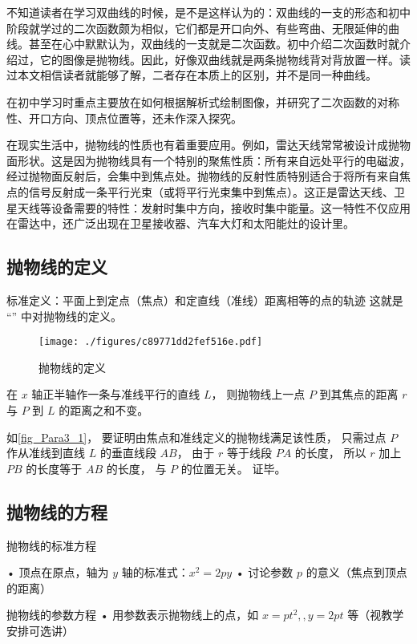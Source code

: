 
\begin{issues}
\issueDraft
\end{issues}



不知道读者在学习双曲线的时候，是不是这样认为的：双曲线的一支的形态和初中阶段就学过的二次函数颇为相似，它们都是开口向外、有些弯曲、无限延伸的曲线。甚至在心中默默认为，双曲线的一支就是二次函数。初中介绍二次函数时就介绍过，它的图像是抛物线。因此，好像双曲线就是两条抛物线背对背放置一样。读过本文相信读者就能够了解，二者存在本质上的区别，并不是同一种曲线。

在初中学习时重点主要放在如何根据解析式绘制图像，并研究了二次函数的对称性、开口方向、顶点位置等，还未作深入探究。

在现实生活中，抛物线的性质也有着重要应用。例如，雷达天线常常被设计成抛物面形状。这是因为抛物线具有一个特别的聚焦性质：所有来自远处平行的电磁波，经过抛物面反射后，会集中到焦点处。抛物线的反射性质特别适合于将所有来自焦点的信号反射成一条平行光束（或将平行光束集中到焦点）。这正是雷达天线、卫星天线等设备需要的特性：发射时集中方向，接收时集中能量。这一特性不仅应用在雷达中，还广泛出现在卫星接收器、汽车大灯和太阳能灶的设计里。

\subsection{抛物线的定义}
标准定义：平面上到定点（焦点）和定直线（准线）距离相等的点的轨迹
这就是 “” 中对抛物线的定义。
\begin{figure}[ht]
\centering
\texttt{[image: ./figures/c89771dd2fef516e.pdf]}
\caption{抛物线的定义} \label{fig_Para3_1}
\end{figure}

在 $x$ 轴正半轴作一条与准线平行的直线 $L$， 则抛物线上一点 $P$ 到其焦点的距离 $r$ 与 $P$ 到 $L$ 的距离之和不变。

如\autoref{fig_Para3_1}， 要证明由焦点和准线定义的抛物线满足该性质， 只需过点 $P$ 作从准线到直线 $L$ 的垂直线段 $AB$， 由于 $r$ 等于线段 $PA$ 的长度， 所以 $r$ 加上 $PB$ 的长度等于 $AB$ 的长度， 与 $P$ 的位置无关。 证毕。


\subsection{抛物线的方程}
\begin{theorem}{抛物线的标准方程}

\end{theorem}
	•	顶点在原点，轴为 $y$ 轴的标准式：$x^2=2py$
	•	讨论参数 $p$ 的意义（焦点到顶点的距离）
\begin{theorem}{抛物线的参数方程}
	•	用参数表示抛物线上的点，如 $x=pt^2,,y=2pt$ 等（视教学安排可选讲）
\end{theorem}

